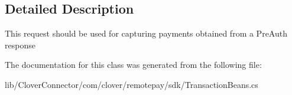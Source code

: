 \subsection{Detailed Description}
This request should be used for capturing payments obtained from a Pre\+Auth response 



The documentation for this class was generated from the following file\+:\begin{DoxyCompactItemize}
\item 
lib/\+Clover\+Connector/com/clover/remotepay/sdk/Transaction\+Beans.\+cs\end{DoxyCompactItemize}
